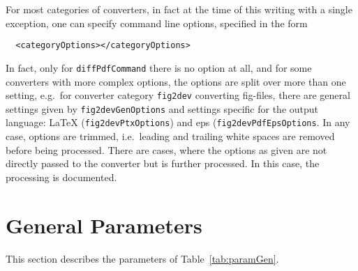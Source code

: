 For most categories of converters, in fact at the time of this writing with a single exception, 
one can specify command line options, specified in the form 
%
\begin{verbatim}
  <categoryOptions></categoryOptions>
\end{verbatim}
%
In fact, only for \texttt{diffPdfCommand} there is no option at all, 
and for some converters with more complex options, the options are split over more than one setting, 
e.g.~for converter category \texttt{fig2dev} converting \gls{fig}-files, 
there are general settings given by \texttt{fig2devGenOptions}
and settings specific for the output language: 
\LaTeX{} (\texttt{fig2devPtxOptions}) and \gls{eps} (\texttt{fig2devPdfEpsOptions}. 
In any case, options are trimmed, i.e.~leading and trailing white spaces are removed 
before being processed. 
There are cases, where the options as given are not directly passed to the converter 
but is further processed. 
In this case, the processing is documented. 





\section{General Parameters}\label{sec:settingsGen}

This section describes the parameters of Table~\ref{tab:paramGen}. 

